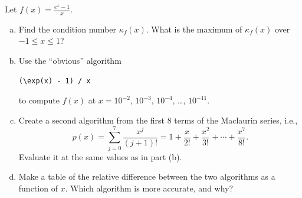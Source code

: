 \documentclass[11pt]{article}
\newenvironment{problem}[2][Question]{\begin{trivlist}
\item[\hskip \labelsep {\bfseries #1}\hskip \labelsep {\bfseries #2.}]}{\end{trivlist}}
\theoremstyle{definition}
\begin{document}
\newpage



\begin{problem}{2}
Let $f(x) = \frac{e^x - 1}{x}$.
\begin{enumerate}[(a)]
    \item Find the condition number $\kappa_f(x)$. What is the maximum of $\kappa_f(x)$ over $-1 \leq x \leq 1$?
    \item Use the ``obvious'' algorithm
    \begin{verbatim}
(\exp(x) - 1) / x
    \end{verbatim}
    to compute $f(x)$ at $x = 10^{-2}$, $10^{-3}$, $10^{-4}$, \ldots, $10^{-11}$.
    \item Create a second algorithm from the first $8$ terms of the Maclaurin series, i.e.,
    $$p(x) = \sum_{j = 0}^7 \frac{x^j}{(j+1)!} = 1 + \frac{x}{2!} + \frac{x^2}{3!} + \cdots + \frac{x^7}{8!}.$$ Evaluate it at the same values as in part (b).
    \item Make a table of the relative difference between the two algorithms as a function of $x$. Which algorithm is more accurate, and why?
\end{enumerate}
\end{problem}
\end{document}

